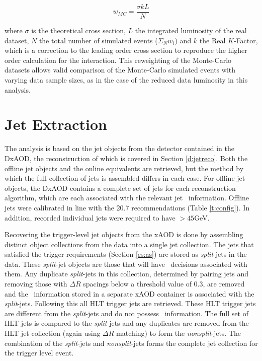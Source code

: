 		 \begin{equation}
		 w_{MC} = \frac{\sigma k L}{N}
		 \end{equation}

		 where $\sigma$ is the theoretical cross section, $L$ the integrated luminosity of the real dataset, $N$ the total number of simulated events ($\Sigma_N w_i$) and $k$ the Real $K$-Factor, which is a correction to the leading order cross section to reproduce the higher order calculation for the interaction. This reweighting of the Monte-Carlo datasets allows valid comparison of the Monte-Carlo simulated events with varying data sample sizes, as in the case of the reduced data luminosity in this analysis.


	\section{Jet Extraction}
	\label{es:jetextract}

		The analysis is based on the jet objects from the detector contained in the DxAOD, the reconstruction of which is covered in Section \ref{d:jetreco}. Both the offline jet objects and the online equivalents are retrieved, but the method by which the full collection of jets is assembled differs in each case. For offline jet objects, the DxAOD contains a complete set of jets for each reconstruction algorithm, which are each associated with the relevant jet \btag\, information. Offline jets were calibrated in line with the 20.7 recommendations (Table \ref{t:config}). In addition, recorded individual jets were required to have \pt$>45$GeV.

		Recovering the trigger-level jet objects from the xAOD is done by assembling distinct object collections from the data into a single jet collection. The jets that satisfied the trigger requirements (Section \ref{es:as}) are stored as \textit{split}-jets in the data. These \textit{split}-jet objects are those that will have \btag\ decisions associated with them. Any duplicate \textit{split}-jets in this collection, determined by pairing jets and removing those with $\Delta R$ spacings below a threshold value of 0.3, are removed and the \btag\, information stored in a separate xAOD container is associated with the \textit{split}-jets. Following this all HLT trigger jets are retrieved. These HLT trigger jets are different from the \textit{split}-jets and do not possess \btag\, information. The full set of HLT jets is compared to the \textit{split}-jets and any duplicates are removed from the HLT jet collection (again using $\Delta R$ matching) to form the \textit{nonsplit}-jets. The combination of the \textit{split}-jets and \textit{nonsplit}-jets forms the complete jet collection for the trigger level event.

